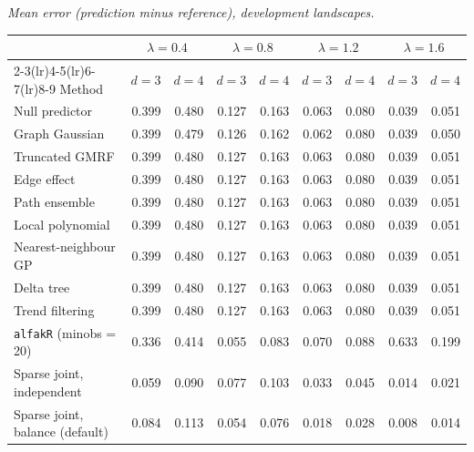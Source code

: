 \par\medskip\noindent\begin{minipage}{\linewidth}
\textit{Mean error (prediction minus reference), development landscapes.}
\begin{center}
\footnotesize
\setlength{\tabcolsep}{3.5pt}
\begin{tabular}{l*{8}{r}}
\toprule
 & \multicolumn{2}{c}{$\lambda=0.4$} & \multicolumn{2}{c}{$\lambda=0.8$} & \multicolumn{2}{c}{$\lambda=1.2$} & \multicolumn{2}{c}{$\lambda=1.6$} \\
\cmidrule(lr){2-3}\cmidrule(lr){4-5}\cmidrule(lr){6-7}\cmidrule(lr){8-9}
Method & $d=3$ & $d=4$ & $d=3$ & $d=4$ & $d=3$ & $d=4$ & $d=3$ & $d=4$ \\
\midrule
Null predictor & 0.399 & 0.480 & 0.127 & 0.163 & 0.063 & 0.080 & 0.039 & 0.051 \\
Graph Gaussian & 0.399 & 0.479 & 0.126 & 0.162 & 0.062 & 0.080 & 0.039 & 0.050 \\
Truncated GMRF & 0.399 & 0.480 & 0.127 & 0.163 & 0.063 & 0.080 & 0.039 & 0.051 \\
Edge effect & 0.399 & 0.480 & 0.127 & 0.163 & 0.063 & 0.080 & 0.039 & 0.051 \\
Path ensemble & 0.399 & 0.480 & 0.127 & 0.163 & 0.063 & 0.080 & 0.039 & 0.051 \\
Local polynomial & 0.399 & 0.480 & 0.127 & 0.163 & 0.063 & 0.080 & 0.039 & 0.051 \\
Nearest-neighbour GP & 0.399 & 0.480 & 0.127 & 0.163 & 0.063 & 0.080 & 0.039 & 0.051 \\
Delta tree & 0.399 & 0.480 & 0.127 & 0.163 & 0.063 & 0.080 & 0.039 & 0.051 \\
Trend filtering & 0.399 & 0.480 & 0.127 & 0.163 & 0.063 & 0.080 & 0.039 & 0.051 \\
\texttt{alfakR} (minobs = 20) & 0.336 & 0.414 & 0.055 & 0.083 & 0.070 & 0.088 & 0.633 & 0.199 \\
Sparse joint, independent & 0.059 & 0.090 & 0.077 & 0.103 & 0.033 & 0.045 & 0.014 & 0.021 \\
Sparse joint, balance (default) & 0.084 & 0.113 & 0.054 & 0.076 & 0.018 & 0.028 & 0.008 & 0.014 \\
\bottomrule
\end{tabular}
\end{center}
\end{minipage}


